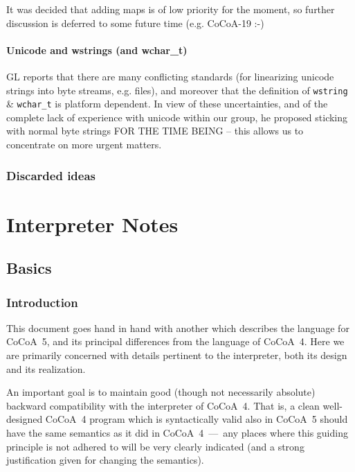 \documentclass{book}[12,a4paper]
\begin{document}
It was decided that adding maps is of low priority for the moment, so
further discussion is deferred to some future time (e.g. CoCoA-19 :-)


\subsection{Unicode and wstrings (and wchar\_t)}

GL reports that there are many conflicting standards (for linearizing
unicode strings into byte streams, e.g. files), and moreover that the
definition of \texttt{wstring} \& \verb|wchar_t| is platform dependent.
In view of these uncertainties, and of the complete lack of experience
with unicode within our group, he proposed sticking with normal byte
strings FOR THE TIME BEING -- this allows us to concentrate on more
urgent matters.

\section{Discarded ideas}
\label{discarded}



\part{Interpreter Notes}

\chapter{Basics}

\section{Introduction}

This document goes hand in hand with another which describes the language
for CoCoA~5, and its principal differences from the language of CoCoA~4.
Here we are primarily concerned with details pertinent to the interpreter,
both its design and its realization.

An important goal is to maintain good (though not necessarily
absolute) backward compatibility with the interpreter of CoCoA~4.
That is, a clean well-designed CoCoA~4 program which is syntactically
valid also in CoCoA~5 should have the same semantics as it did in
CoCoA~4~---~any places where this guiding principle is not adhered to
will be very clearly indicated (and a strong justification given for
changing the semantics).
\end{document}

